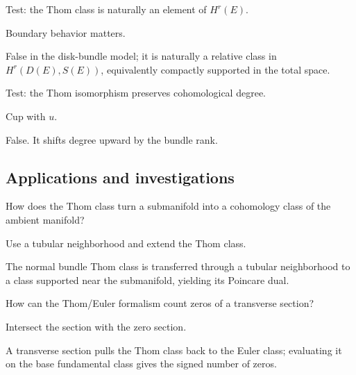 \begin{exercise}\label{exr:viii31-ped-11}
Test: the Thom class is naturally an element of $H^r(E)$.
\end{exercise}
\begin{hint}
Boundary behavior matters.
\end{hint}
\begin{solution}
False in the disk-bundle model; it is naturally a relative class in $H^r(D(E),S(E))$, equivalently compactly supported in the total space.
\end{solution}

\begin{exercise}\label{exr:viii31-ped-12}
Test: the Thom isomorphism preserves cohomological degree.
\end{exercise}
\begin{hint}
Cup with $u$.
\end{hint}
\begin{solution}
False. It shifts degree upward by the bundle rank.
\end{solution}

\subsection*{Applications and investigations}

\begin{exercise}\label{exr:viii31-ped-13}
How does the Thom class turn a submanifold into a cohomology class of the ambient manifold?
\end{exercise}
\begin{hint}
Use a tubular neighborhood and extend the Thom class.
\end{hint}
\begin{solution}
The normal bundle Thom class is transferred through a tubular neighborhood to a class supported near the submanifold, yielding its Poincare dual.
\end{solution}

\begin{exercise}\label{exr:viii31-ped-14}
How can the Thom/Euler formalism count zeros of a transverse section?
\end{exercise}
\begin{hint}
Intersect the section with the zero section.
\end{hint}
\begin{solution}
A transverse section pulls the Thom class back to the Euler class; evaluating it on the base fundamental class gives the signed number of zeros.
\end{solution}

